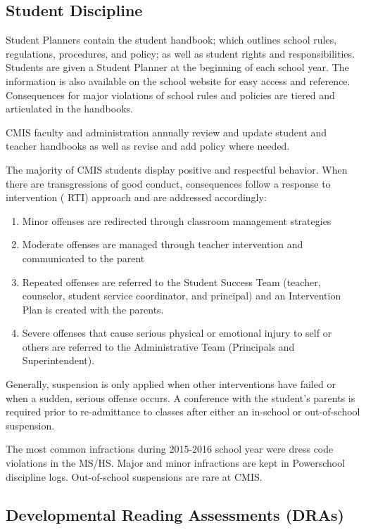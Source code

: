 \subsection{Student Discipline}
Student Planners contain the student handbook; which outlines school rules, regulations, procedures, and policy; as well as student rights and responsibilities.  Students are given a Student Planner at the beginning of each school year.  The information is also available on the school website for easy access and reference.  Consequences for major violations of school rules and policies are tiered and articulated in the handbooks. 

CMIS faculty and administration annually review and update student and teacher handbooks as well as revise and add policy where needed. 

The majority of CMIS students display positive and respectful behavior. When there are transgressions of good conduct, consequences follow a response to intervention ( RTI) approach and are addressed accordingly:

\begin{enumerate}
\item Minor offenses are redirected through classroom management strategies 
\item Moderate offenses are managed through teacher intervention and communicated to the parent
\item Repeated offenses are referred to the Student Success Team (teacher, counselor, student service coordinator, and principal) and an Intervention Plan is created with the parents. 
\item Severe offenses that cause serious physical or emotional injury to self or others are referred to the Administrative Team (Principals and Superintendent). 
\end{enumerate}

Generally, suspension is only applied when other interventions have failed or when a sudden, serious offense occurs. A conference with the student’s parents is required prior to re-admittance to classes after either an in-school or out-of-school suspension. 

The most common infractions during 2015-2016 school year were dress code violations in the MS/HS.  Major and minor infractions are kept in Powerschool discipline logs. Out-of-school suspensions are rare at CMIS.


\subsection{Developmental Reading Assessments (DRAs)}

